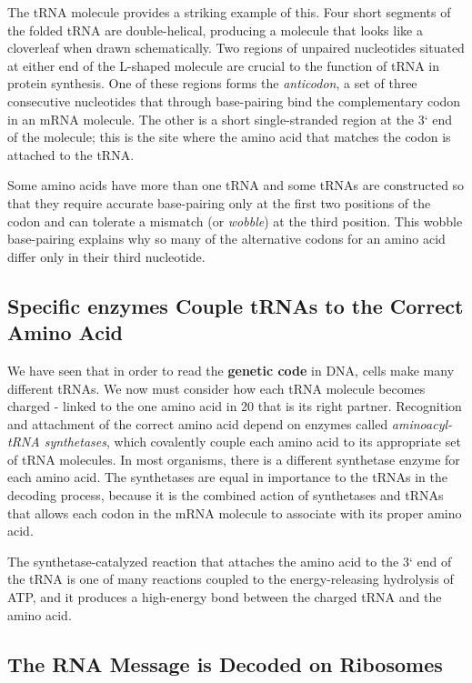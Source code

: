 The tRNA molecule provides a striking example of this. Four short segments
of the folded tRNA are double-helical, producing a molecule that
looks like a cloverleaf when drawn schematically.
Two regions of unpaired nucleotides situated at either end of the L-shaped
molecule are crucial to the function of tRNA in protein synthesis. One
of these regions forms the \textit{anticodon}, a set of three consecutive nucleotides
that through base-pairing bind the complementary codon in an
mRNA molecule. The other is a short single-stranded region at the 3` end
of the molecule; this is the site where the amino acid that matches the
codon is attached to the tRNA.

Some amino acids have more than one tRNA and some tRNAs are constructed so that
they require accurate base-pairing only at the first two positions of the
codon and can tolerate a mismatch (or \textit{wobble}) at the third position. This
wobble base-pairing explains why so many of the alternative codons
for an amino acid differ only in their third nucleotide.

\subsection{Specific enzymes Couple tRNAs to the Correct Amino Acid}

We have seen that in order to read the \textbf{genetic code} in DNA, cells make
many different tRNAs. We now must consider how each tRNA molecule
becomes charged - linked to the one amino acid in 20 that is its right partner.
Recognition and attachment of the correct amino acid depend on
enzymes called \textit{aminoacyl-tRNA synthetases}, which covalently couple
each amino acid to its appropriate set of tRNA molecules. In most organisms,
there is a different synthetase enzyme for each amino acid. The
synthetases are equal in importance to the tRNAs in the decoding process,
because it is the combined action of synthetases and tRNAs that
allows each codon in the mRNA molecule to associate with its proper
amino acid.

The synthetase-catalyzed reaction that attaches the amino acid to the 3`
end of the tRNA is one of many reactions coupled to the energy-releasing
hydrolysis of ATP, and it produces a high-energy bond
between the charged tRNA and the amino acid.

\subsection{The RNA Message is Decoded on Ribosomes}

